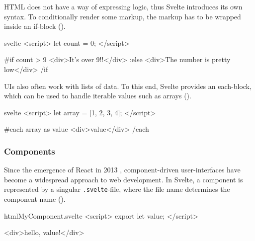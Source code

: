 HTML does not have a way of expressing logic, thus Svelte introduces its own syntax. To conditionally render some markup, the markup has to be wrapped inside an if-block ().

\begin{listing}[H]
\begin{myminted}{svelte}{}
<script>
  let count = 0;
</script>

{#if count > 9}
  <div>It's over 9!!</div>
{:else}
  <div>The number is pretty low</div>
{/if}
\end{myminted}
\caption{Example usage of Svelte's if-block.}
\label{fig:svelte-if-syntax} 
\end{listing}

UIs also often work with lists of data. To this end, Svelte provides an each-block, which can be used to handle iterable values such as arrays ().

\begin{listing}[H]
\begin{myminted}{svelte}{}
<script>
  let array = [1, 2, 3, 4];
</script>

{#each array as value}
  <div>{value}</div>
{/each}
\end{myminted}
\caption{Example usage of Svelte's each-block.}
\label{fig:svelte-array-syntax} 
\end{listing}

\subsubsection{Components}


Since the emergence of React in 2013 \cite{occhino_js_2013}, component-driven user-interfaces have become a widespread approach to web development. In Svelte, a component is represented by a singular \texttt{.svelte}-file, where the file name determines the component name ().

\begin{listing}[H]
\begin{myminted}{html}{MyComponent.svelte}
<script>
  export let value;
</script>

<div>hello, {value}!</div>
\end{myminted}
\caption{Basic Svelte component that defines the input \texttt{value}.}
\label{fig:svelte-component-basic}
\end{listing}

